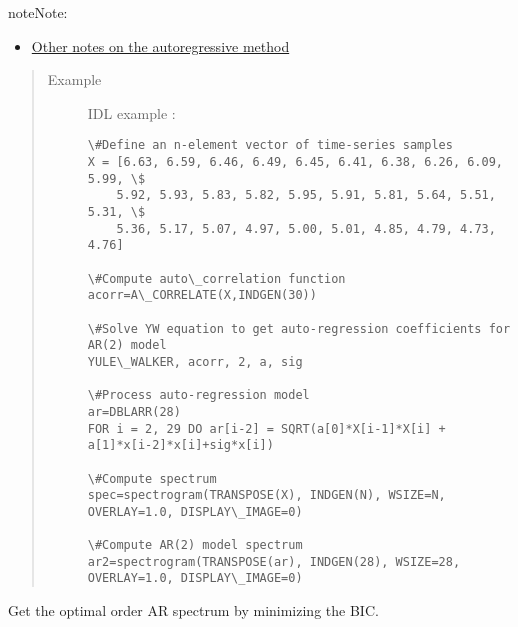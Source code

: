 \documentclass[letterpaper,10pt,english]{sphinxmanual}
\begin{document}
\begin{fulllineitems}
\begin{notice}{note}{Note:}
\begin{itemize}
\item {} 
\href{http://www.ee.lamar.edu/gleb/adsp/Lecture\%2009\%20-\%20Parametric\%20SE.pdf}{Other notes on the autoregressive method}

\end{itemize}
\end{notice}
\begin{quote}\begin{description}
\item[{Example }] \leavevmode
IDL example :

\begin{Verbatim}[commandchars=\\\{\}]
\#Define an n-element vector of time-series samples  
X = [6.63, 6.59, 6.46, 6.49, 6.45, 6.41, 6.38, 6.26, 6.09, 5.99, \$  
    5.92, 5.93, 5.83, 5.82, 5.95, 5.91, 5.81, 5.64, 5.51, 5.31, \$  
    5.36, 5.17, 5.07, 4.97, 5.00, 5.01, 4.85, 4.79, 4.73, 4.76]  

\#Compute auto\_correlation function
acorr=A\_CORRELATE(X,INDGEN(30))

\#Solve YW equation to get auto-regression coefficients for AR(2) model
YULE\_WALKER, acorr, 2, a, sig

\#Process auto-regression model
ar=DBLARR(28)
FOR i = 2, 29 DO ar[i-2] = SQRT(a[0]*X[i-1]*X[i] + a[1]*x[i-2]*x[i]+sig*x[i])

\#Compute spectrum
spec=spectrogram(TRANSPOSE(X), INDGEN(N), WSIZE=N, OVERLAY=1.0, DISPLAY\_IMAGE=0)

\#Compute AR(2) model spectrum
ar2=spectrogram(TRANSPOSE(ar), INDGEN(28), WSIZE=28, OVERLAY=1.0, DISPLAY\_IMAGE=0)
\end{Verbatim}

\end{description}\end{quote}

\end{fulllineitems}


\begin{fulllineitems}
\label{altimetry.tools.spectrum:altimetry.tools.spectrum.optimal_AR_spectrum}
Get the optimal order AR spectrum by minimizing the BIC.

\end{fulllineitems}
\end{document}
